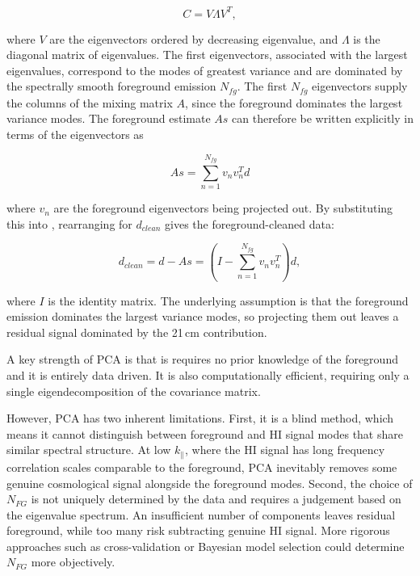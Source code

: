 \begin{equation}
    C = V\Lambda V^T,
\end{equation}

where $V$ are the eigenvectors ordered by decreasing eigenvalue, and $\Lambda$ is the diagonal matrix of eigenvalues. The first eigenvectors, associated with the largest eigenvalues, correspond to the modes of greatest variance and are dominated by the spectrally smooth foreground emission $N_{fg}$. The first $N_{fg}$ eigenvectors supply the columns of the mixing matrix $A$, since the foreground dominates the largest variance modes. The foreground estimate $As$ can therefore be written explicitly in terms of the eigenvectors as

\begin{equation}
    As = \sum_{n=1}^{N_{fg}}v_nv_n^Td
\end{equation}

where $v_n$ are the foreground eigenvectors being projected out. By substituting this into , rearranging for $d_{clean}$ gives the foreground-cleaned data: 

\begin{equation}
    d_{clean} = d - As = (I - \sum_{n=1}^{N_{fg}}v_nv_n^T)d,
\end{equation}

where $I$ is the identity matrix. The underlying assumption is that the foreground emission dominates the largest variance modes, so projecting them out leaves a residual signal dominated by the 21\,cm contribution. 


A key strength of PCA is that is requires no prior knowledge of the foreground and it is entirely data driven. It is also computationally efficient, requiring only a single eigendecomposition of the covariance matrix.

However, PCA has two inherent limitations. First, it is a blind method, which means it cannot distinguish between foreground and HI signal modes that share similar spectral structure. At low $k_{\parallel}$, where the HI signal has long frequency correlation scales comparable to the foreground, PCA inevitably removes some genuine cosmological signal alongside the foreground modes. Second, the choice of $N_{FG}$ is not uniquely determined by the data and requires a judgement based on the eigenvalue spectrum. An insufficient number of components leaves residual foreground, while too many risk subtracting genuine HI signal. More rigorous approaches such as cross-validation or Bayesian model selection could determine $N_{FG}$ more objectively. 

